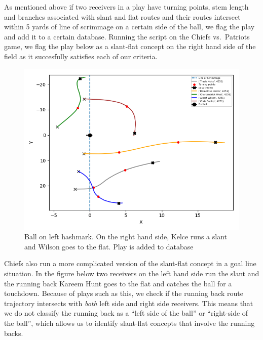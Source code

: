 \documentclass[12pt,oneside]{dukestatscithesis}
\theoremstyle{definition}
\theoremstyle{definition}
\theoremstyle{definition}
\theoremstyle{remark}
\begin{document}
As mentioned above if two receivers in a play have turning points, stem
length and branches associated with slant and flat routes and their
routes intersect within 5 yards of line of scrimmage on a certain side
of the ball, we flag the play and add it to a certain database. Running
the script on the Chiefs vs.~Patriots game, we flag the play below as a
slant-flat concept on the right hand side of the field as it succesfully
satisfies each of our criteria.
\begin{figure}
\includegraphics[width=8.89in,angle=360, scale=0.6]{figure/4251} \caption{Ball on left hashmark. On the right hand side, Kelce runs a slant and Wilson goes to the flat. Play is added to database }\label{fig:slantflat1}
\end{figure}
Chiefs also run a more complicated version of the slant-flat concept in
a goal line situation. In the figure below two receivers on the left
hand side run the slant and the running back Kareem Hunt goes to the
flat and catches the ball for a touchdown. Because of plays such as
this, we check if the running back route trajectory intersects with
\emph{both} left side and right side receivers. This means that we do
not classify the running back as a ``left side of the ball'' or
``right-side of the ball'', which allows us to identify slant-flat
concepts that involve the running backs.
\end{document}
